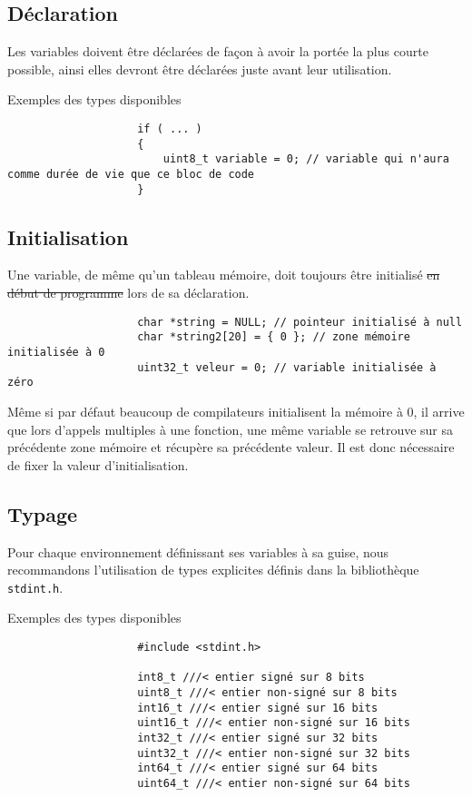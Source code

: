 		\subsection{Déclaration}
			Les variables doivent être déclarées de façon à avoir la portée la plus courte possible, ainsi elles devront être déclarées juste avant leur utilisation.

			\begin{cbox}{Exemples des types disponibles}
				\begin{verbatim}
					if ( ... )
					{
					    uint8_t variable = 0; // variable qui n'aura comme durée de vie que ce bloc de code
					}
				\end{verbatim}
			\end{cbox}

		\subsection{Initialisation}
			Une variable, de même qu'un tableau mémoire, doit toujours être initialisé \sout{en début de programme} lors de sa déclaration.
			
			\begin{cbox}{}
				\begin{verbatim}
					char *string = NULL; // pointeur initialisé à null
					char *string2[20] = { 0 }; // zone mémoire initialisée à 0
					uint32_t veleur = 0; // variable initialisée à zéro
				\end{verbatim}
			\end{cbox}

			Même si par défaut beaucoup de compilateurs initialisent la mémoire à 0, il arrive que lors d'appels multiples à une fonction, une même variable se retrouve sur sa précédente zone mémoire et récupère sa précédente valeur. Il est donc nécessaire de fixer la valeur d'initialisation.

		\subsection{Typage}
			Pour chaque environnement définissant ses variables à sa guise, nous recommandons l'utilisation de types explicites définis dans la bibliothèque \verb+stdint.h+.

			\begin{cbox}{Exemples des types disponibles}
				\begin{verbatim}
					#include <stdint.h>

					int8_t ///< entier signé sur 8 bits
					uint8_t ///< entier non-signé sur 8 bits
					int16_t ///< entier signé sur 16 bits
					uint16_t ///< entier non-signé sur 16 bits
					int32_t ///< entier signé sur 32 bits
					uint32_t ///< entier non-signé sur 32 bits
					int64_t ///< entier signé sur 64 bits
					uint64_t ///< entier non-signé sur 64 bits
				\end{verbatim}
			\end{cbox}

